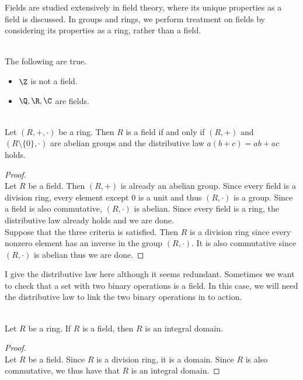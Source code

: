 \documentclass[a4paper]{article}
\begin{document}
Fields are studied extensively in field theory, where its unique properties as a field is discussed. In groups and rings, we perform treatment on fields by considering its properties as a ring, rather than a field. 

\begin{eg}{}{}\\
The following are true. 
\begin{itemize}
\item $\Z$ is not a field. 
\item $\Q,\R,\C$ are fields. 
\end{itemize}
\end{eg}

\begin{prp}{}{}\\
Let $(R,+,\cdot)$ be a ring. Then $R$ is a field if and only if $(R,+)$ and $(R\setminus\{0\},\cdot)$ are abelian groups and the distributive law $a(b+c)=ab+ac$ holds. 
\begin{proof}\\
Let $R$ be a field. Then $(R,+)$ is already an abelian group. Since every field is a division ring, every element except $0$ is a unit and thus $(R,\cdot)$ is a group. Since a field is also commutative, $(R,\cdot)$ is abelian. Since every field is a ring, the distributive law already holds and we are done. \\
Suppose that the three criteria is satisfied. Then $R$ is a division ring since every nonzero element has an inverse in the group $(R,\cdot)$. It is also commutative since $(R,\cdot)$ is abelian thus we are done. 
\end{proof}
\end{prp}

I give the distributive law here although it seems redundant. Sometimes we want to check that a set with two binary operations is a field. In this case, we will need the distributive law to link the two binary operations in to action. 

\begin{prp}{}{}\\
Let $R$ be a ring. If $R$ is a field, then $R$ is an integral domain. 
\begin{proof}\\
Let $R$ be a field. Since $R$ is a division ring, it is a domain. Since $R$ is also commutative, we thus have that $R$ is an integral domain. 
\end{proof}
\end{prp}
\end{document}
